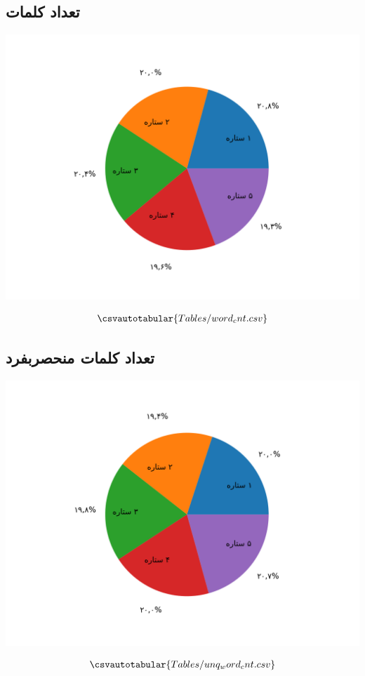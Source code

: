 {\subsection{تعداد کلمات}
{
\begin{center}
\includegraphics[scale=0.75]{Images/word_cnt.png}
\end{center}
\begin{align*}
  \csvautotabular{Tables/word_cnt.csv}  
\end{align*}
}
\newpage
\subsection{تعداد کلمات منحصربفرد}
{
\begin{center}
\includegraphics[scale=0.75]{Images/unq_word_cnt.png}
\end{center}
\begin{align*}
  \csvautotabular{Tables/unq_word_cnt.csv}  
\end{align*}
}
\newpage
}
